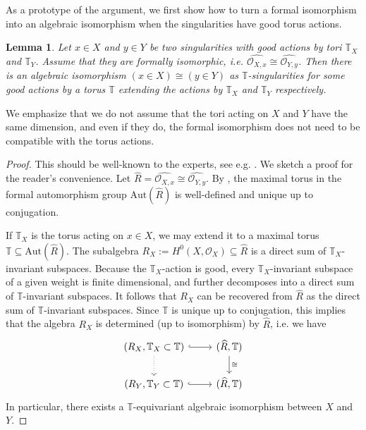 \documentclass[12pt]{amsart}
\newtheorem{lem}[prop]{Lemma}
\theoremstyle{definition}
\newcommand{\bT}{\mathbb{T}}
\newcommand{\cO}{\mathcal{O}}
\newcommand{\Aut}{\mathrm{Aut}}
\numberwithin{equation}{section}
\begin{document}
As a prototype of the argument, we first show how to turn a formal isomorphism into an algebraic isomorphism when the singularities have good torus actions.

\begin{lem} \label{lem:cone formal isom = alg isom}
Let $x\in X$ and $y\in Y$ be two singularities with good actions by tori $\mathbb T_X$ and $\mathbb T_Y$. Assume that they are formally isomorphic, i.e. $\widehat{\cO_{X,x}}\cong \widehat{\cO_{Y,y}}$. Then there is an algebraic isomorphism $(x\in X)\cong (y\in Y)$ as $\mathbb{T}$-singularities for some good actions by a torus $\mathbb T$ extending the actions by $\mathbb T_X$ and $\mathbb T_Y$ respectively.
\end{lem}

We emphasize that we do not assume that the tori acting on $X$ and $Y$ have the same dimension, and even if they do, the formal isomorphism does not need to be compatible with the torus actions.

\begin{proof}
This should be well-known to the experts, see e.g. \cite[Section 8]{Kol-cone-auto}. We sketch a proof for the reader's convenience. Let $\widehat{R}=\widehat{\cO_{X,x}}\cong \widehat{\cO_{Y,y}}$. By \cite[8.4]{Kol-cone-auto}, the maximal torus in the formal automorphism group $\Aut(\widehat{R})$ is well-defined and unique up to conjugation. 

If $\bT_X$ is the torus acting on $x\in X$, we may extend it to a maximal torus $\bT\subseteq \Aut(\widehat{R})$. The subalgebra $R_X:=H^0(X,\cO_X)\subseteq \widehat{R}$ is a direct sum of $\bT_X$-invariant subspaces. Because the $\bT_X$-action is good, every $\bT_X$-invariant subspace of a given weight is finite dimensional, and further decomposes into a direct sum of $\bT$-invariant subspaces. It follows that $R_X$ can be recovered from $\widehat{R}$ as the direct sum of $\bT$-invariant subspaces. Since $\bT$ is unique up to conjugation, this implies that the algebra $R_X$ is determined (up to isomorphism) by $\widehat{R}$, i.e. we have
\[
\begin{tikzcd}
 (R_X, \mathbb T_X\subset \mathbb T) \arrow[r, hook] \arrow[d,dotted] & (\widehat{R},\mathbb{T})\arrow{d}{\cong}  \\
(R_Y, \mathbb T_Y\subset \mathbb T) \arrow[r,hook] & (\widehat{R},\mathbb{T})
\end{tikzcd}
\]
In particular, there exists a $\mathbb T$-equivariant algebraic isomorphism between $X$ and $Y$.  
\end{proof}
\end{document}
